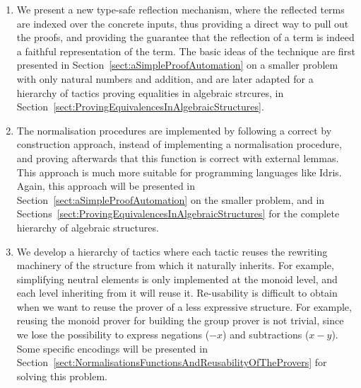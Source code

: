 \begin{enumerate}

\item We present a new type-safe reflection mechanism, where the reflected terms are indexed over the concrete inputs, thus providing a
direct way to pull out the proofs, and providing the guarantee that the reflection of a term is indeed a faithful representation of the term.
The basic ideas of the technique are first presented in Section~\ref{sect:aSimpleProofAutomation} on a smaller problem with only natural numbers and addition, and are later adapted for a hierarchy of tactics proving equalities in algebraic strcures, in Section~\ref{sect:ProvingEquivalencesInAlgebraicStructures}. 

\item The normalisation procedures are implemented by following a
correct by construction approach, instead of implementing a
normalisation procedure, and proving afterwards that this function
is correct with external lemmas. This approach is much more suitable
for programming languages like Idris. Again, this approach will be
presented in Section~\ref{sect:aSimpleProofAutomation} on the smaller problem, 
and in Sections~\ref{sect:ProvingEquivalencesInAlgebraicStructures} for the complete hierarchy of algebraic structures.

\item We develop a hierarchy of tactics where each tactic reuses the
rewriting machinery of the structure from which it naturally inherits.
For example, simplifying neutral elements is only implemented at the monoid level,
and each level inheriting from it will reuse it. Re-usability is difficult to obtain when we want to reuse the prover of a less expressive structure. For example, reusing the monoid prover for building the
group prover is not trivial, since we lose the possibility to express
negations ($-x$) and subtractions ($x-y$). Some specific encodings
will be presented in Section~\ref{sect:NormalisationsFunctionsAndReusabilityOfTheProvers} for solving this problem.

\end{enumerate}


